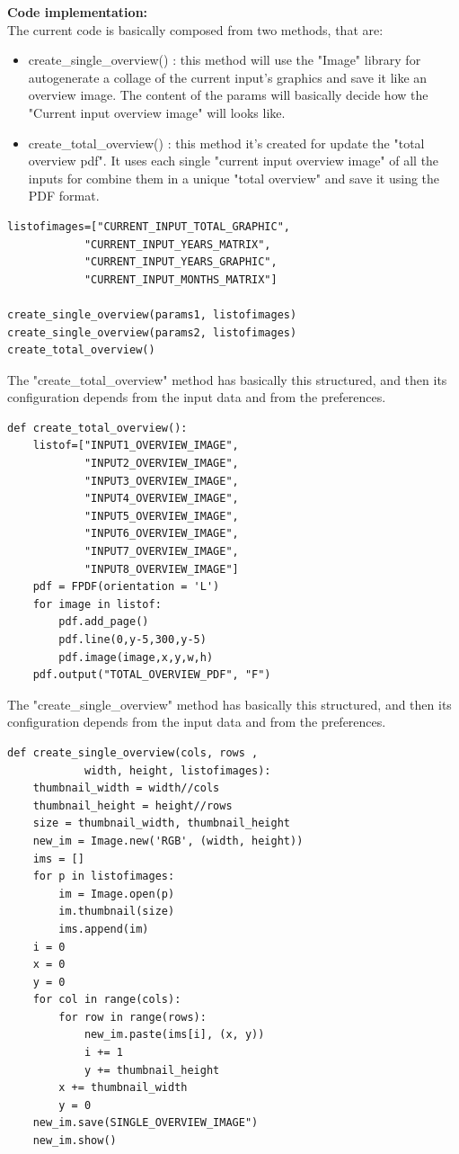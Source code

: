 \textbf{Code implementation:}\\
The current code is basically composed from two methods, that are:
\begin{itemize}
\item create\_single\_overview() : this method will use the "Image" library for autogenerate a collage of the current input's graphics and save it like an overview image. The content of the params will basically decide how the "Current input overview image" will looks like.
\item create\_total\_overview() : this method it's created for update the "total overview pdf".
It uses each single "current input overview image" of all the inputs for combine them in a unique "total overview" and save it using the PDF format.
\end{itemize}
\begin{lstlisting}
listofimages=["CURRENT_INPUT_TOTAL_GRAPHIC",
            "CURRENT_INPUT_YEARS_MATRIX", 
            "CURRENT_INPUT_YEARS_GRAPHIC",
            "CURRENT_INPUT_MONTHS_MATRIX"]
           
create_single_overview(params1, listofimages)
create_single_overview(params2, listofimages)
create_total_overview()
\end{lstlisting}

\newpage
The "create\_total\_overview" method has basically this structured, and then its configuration depends from the input data and from the preferences.
\begin{lstlisting}
def create_total_overview():
    listof=["INPUT1_OVERVIEW_IMAGE",
			"INPUT2_OVERVIEW_IMAGE",
			"INPUT3_OVERVIEW_IMAGE",
			"INPUT4_OVERVIEW_IMAGE",
			"INPUT5_OVERVIEW_IMAGE",
			"INPUT6_OVERVIEW_IMAGE",
			"INPUT7_OVERVIEW_IMAGE",
			"INPUT8_OVERVIEW_IMAGE"]	
    pdf = FPDF(orientation = 'L')
    for image in listof:
        pdf.add_page()
        pdf.line(0,y-5,300,y-5)
        pdf.image(image,x,y,w,h)
    pdf.output("TOTAL_OVERVIEW_PDF", "F")
\end{lstlisting}

The "create\_single\_overview" method has basically this structured, and then its configuration depends from the input data and from the preferences.
\begin{lstlisting}
def create_single_overview(cols, rows ,
			width, height, listofimages):
    thumbnail_width = width//cols
    thumbnail_height = height//rows
    size = thumbnail_width, thumbnail_height
    new_im = Image.new('RGB', (width, height))
    ims = []
    for p in listofimages:
        im = Image.open(p)
        im.thumbnail(size)
        ims.append(im)
    i = 0
    x = 0
    y = 0
    for col in range(cols):
        for row in range(rows):
            new_im.paste(ims[i], (x, y))
            i += 1
            y += thumbnail_height
        x += thumbnail_width
        y = 0
    new_im.save(SINGLE_OVERVIEW_IMAGE")
	new_im.show()
\end{lstlisting}

